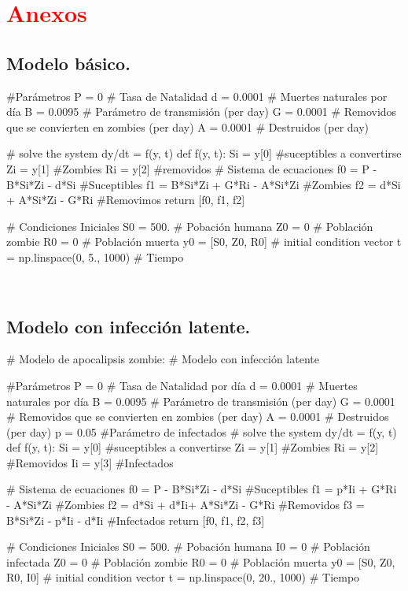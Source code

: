 \documentclass[12pt]{article}
\begin{document}
\section*{\textcolor{Red}{Anexos}}

\subsection*{Modelo básico.}
\begin{boxedverbatim}
#Parámetros
P = 0       # Tasa de Natalidad
d = 0.0001  # Muertes naturales por día
B = 0.0095  # Parámetro de transmisión  (per day)
G = 0.0001  # Removidos que se convierten en zombies (per day)
A = 0.0001  # Destruidos  (per day)

# solve the system dy/dt = f(y, t)
def f(y, t):
    Si = y[0] #suceptibles a convertirse
    Zi = y[1] #Zombies
    Ri = y[2] #removidos
    # Sistema de ecuaciones
    f0 = P - B*Si*Zi - d*Si #Suceptibles
    f1 = B*Si*Zi + G*Ri - A*Si*Zi #Zombies
    f2 = d*Si + A*Si*Zi - G*Ri #Removimos
    return [f0, f1, f2]

# Condiciones Iniciales
S0 = 500.                   # Pobación humana
Z0 = 0                      # Población zombie
R0 = 0                      # Población muerta
y0 = [S0, Z0, R0]   # initial condition vector
t  = np.linspace(0, 5., 1000)       # Tiempo

\end{boxedverbatim}\\

\subsection*{Modelo con infecci\'on latente.}

\begin{boxedverbatim}
# Modelo de apocalipsis zombie: 
# Modelo con infección latente

#Parámetros
P = 0       # Tasa de Natalidad por día
d = 0.0001  # Muertes naturales por día
B = 0.0095  # Parámetro de transmisión  (per day)
G = 0.0001  # Removidos que se convierten en zombies (per day)
A = 0.0001  # Destruidos  (per day)
p = 0.05  #Parámetro de infectados
# solve the system dy/dt = f(y, t)
def f(y, t):
    Si = y[0] #suceptibles a convertirse
    Zi = y[1] #Zombies
    Ri = y[2] #Removidos
    Ii = y[3] #Infectados
    
    # Sistema de ecuaciones
    f0 = P - B*Si*Zi - d*Si #Suceptibles
    f1 = p*Ii + G*Ri - A*Si*Zi #Zombies
    f2 = d*Si + d*Ii+ A*Si*Zi - G*Ri #Removidos
    f3 = B*Si*Zi - p*Ii - d*Ii #Infectados
    return [f0, f1, f2, f3]

# Condiciones Iniciales
S0 = 500.                   # Pobación humana
I0 = 0                      # Población infectada
Z0 = 0                      # Población zombie
R0 = 0                      # Población muerta
y0 = [S0, Z0, R0, I0]   # initial condition vector
t  = np.linspace(0, 20., 1000)       # Tiempo
\end{boxedverbatim}
\end{document}

